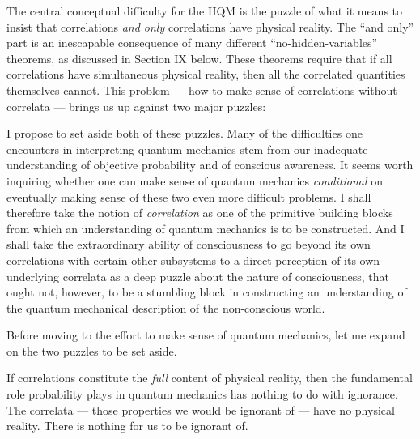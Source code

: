 The central conceptual difficulty for the IIQM is
the puzzle of what it means to insist that correlations {\it and
only\/} correlations have physical reality.  The ``and only'' part is
an inescapable consequence of many different ``no-hidden-variables''
theorems, as discussed in Section IX below.  These theorems require
that if all correlations have simultaneous physical reality, then all
the correlated quantities themselves cannot.  This problem --- how to
make sense of correlations without correlata --- brings us up against
two major puzzles: 



I propose to set aside both of these puzzles.  Many of the
difficulties one encounters in interpreting quantum mechanics stem
from our inadequate understanding of objective probability and of
conscious awareness.  It seems worth inquiring whether one can make
sense of quantum mechanics {\it conditional\/} on eventually making
sense of these two even more difficult problems.  I shall therefore
take the notion of {\it correlation\/} as one of the primitive
building blocks from which an understanding of quantum mechanics is to
be constructed.  And I shall take the extraordinary ability of
consciousness to go beyond its own correlations with certain other
subsystems to a direct perception of its own underlying correlata as a
deep puzzle about the nature of consciousness, that ought not,
however, to be a stumbling block in constructing an understanding of
the quantum mechanical description of the non-conscious world.

Before moving to the effort to make sense of quantum mechanics, let me
expand on the two puzzles to be set aside.

\bigskip{}\nobreak\medskip\nobreak If correlations constitute the {\it
full\/} content of physical reality, then the fundamental role
probability plays in quantum mechanics has nothing to do with
ignorance.  The correlata --- those properties we would be ignorant of
--- have no physical reality.  There is nothing for us to be ignorant
of.  

